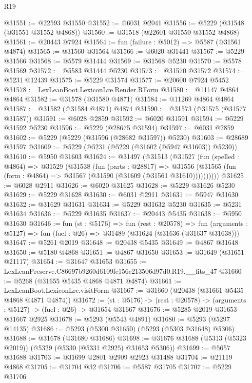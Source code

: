 \begin{lexlean}{R19}
\begin{coremodule}
@31551 := @22593 @31550
@31552 := @6031 @2041
@31556 := @5229 (@31548 (@31551 @31552 @4868))
@31560 := @31518 (@22601 @31550 @31552 @4868)
@31561 := @20443 @7924
@31564 := fun (failure : @5012) => @5587 (@31561 @4874)
@31565 := @31560 @31564
@31566 := @6020 @31441
@31567 := @5229 @31566
@31568 := @5579 @31444
@31569 := @31568 @5230
@31570 := @5578 @31569
@31572 := @5583 @31444 @5230
@31573 := @31570 @31572
@31574 := @5231 @12439
@31575 := @5229 @31574
@31577 := @20600 @7924 @5452
@31578 := LexLeanBoot.LexiconLre.Render.RForm
@31580 := @11147 @4864 @4864
@31582 := @31578 (@31580 @4871)
@31584 := @11269 @4864 @4864
@31587 := @31582 (@31584 @4871) @4874
@31590 := @31573 (@31575 (@31577 @31587))
@31591 := @6028 @2859
@31592 := @6020 @31591
@31594 := @5229 @31592 @5230
@31596 := @5229 (@28675 @31594)
@31597 := @6031 @2859
@31602 := @5229 (@5229 (@31596 (@28682 @31597)) @5230)
@31603 := @28689 @31597
@31609 := @5229 (@5231 (@5229 (@31602 (@5947 @31603)) @5230))
@31610 := @5950 @31603
@31624 := @31497
    (@31513
      (@31527
        (fun (spelled : @4864) =>
        @31529
          (@31538
            (fun (parts : @28817) =>
            @31556 (@31565 (fun (form : @4864) => @31567 (@31590 (@31609 (@31561 @31610))))))))))
@31625 := @6028 @2911
@31626 := @6020 @31625
@31628 := @5229 @31626 @5230
@31629 := @5229 @31628
@31630 := @6031 @2911
@31631 := @5947 @31630
@31632 := @31629 @31631
@31634 := @5229 @31632 @5230
@31635 := @5231 @31634
@31636 := @5229 @31635
@31637 := @20443 @5435
@31638 := @5950 @31630
@31646 := fun (st : @5176) =>
  fun (rest : @20578) =>
  fun (arguments : @5127) => fun (fuel : @26) => @31489 (@31624 (@31636 (@31637 @31638)))
@31647 := @5261 @2019
@31648 := @20438 @5435
@31649 := @4867 @31648
@31650 := @5180 @4868
@31651 := @4867 @31650
@31653 := @31649 (@31651 @21117)
@31654 := @31647 @31653
@31655 := LexLeanPreserve.C86697b9260d6109fe156e213506d97d0.R19.__fits_47
@31660 := @5268 (@31655 @5435 @4868 @4871 @4874)
@31661 := LexLeanBoot.LexiconLre.visitForm
@31667 := @31660 (@20438 (@31661 @5435 @4868 @4871 @4874))
@31672 := (st : @5176) -> (rest : @20578) -> (arguments : @5127) -> (fuel : @26) -> @31654 @31667
@31676 := @5285 @2019 @31653 @31667 @2925
@31678 := @5293 (@5543 @4891)
@31680 := @5293 (@5297 @14135)
@31686 := @5293 (@5300 @31650) (@5293 (@5303 @31648) @5306)
@31688 := @31678 (@31680 @31686)
@31698 := @31676 @31688 (@5313 (@5323 @2019)) (@5329 (@5330 (@5331 @2925) @31653 @5306))
@31699 := @5657 @31688
@31703 := @31699 @2801 @2909 @2923 @31488
@31704 := @21119 @4868
@31705 := @31704 @32
@31706 := @5587 @31705
@31707 := @5229 @31706

\end{coremodule}
\end{lexlean}
